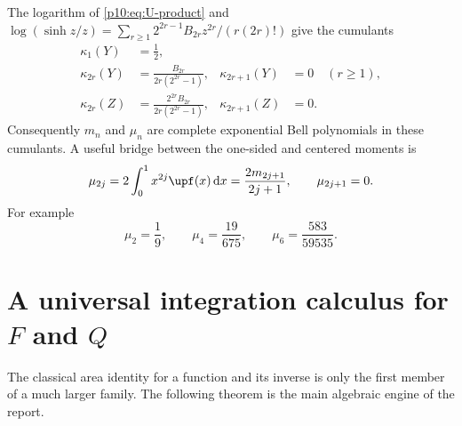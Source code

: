 \documentclass[11pt,oneside]{article}
\theoremstyle{definition}
\theoremstyle{remark}
\newcommand{\F}{F}
\newcommand{\Q}{Q}
\newcommand{\dd}{\,\mathrm d}
\newcommand{\1}{\mathbf 1}
\begin{document}
The logarithm of \cref{p10:eq:U-product} and
\(
 \log(\sinh z/z)
 =\sum_{r\ge1}2^{2r-1}B_{2r}z^{2r}/(r(2r)!)
\)
give the cumulants
\begin{align}
 \kappa_1(Y)&=\frac12,\nonumber\\
 \kappa_{2r}(Y)&=\frac{B_{2r}}{2r(2^{2r}-1)},
 &\kappa_{2r+1}(Y)&=0\quad(r\ge1),\label{p10:eq:Y-cumulants}\\
 \kappa_{2r}(Z)&=\frac{2^{2r}B_{2r}}{2r(2^{2r}-1)},
 &\kappa_{2r+1}(Z)&=0.\label{p10:eq:Z-cumulants}
\end{align}
Consequently \(m_n\) and \(\mu_n\) are complete exponential Bell polynomials in
these cumulants.  A useful bridge between the one-sided and centered moments is
\begin{equation}\label{p10:eq:mu-m-relation}
 \mu_{2j}
 =2\int_0^1x^{2j}\upf(x)\dd x
 =\frac{2m_{2j+1}}{2j+1},
 \qquad \mu_{2j+1}=0.
\end{equation}
For example
\begin{equation}\label{p10:eq:first-central-moments}
 \mu_2=\frac19,\qquad
 \mu_4=\frac{19}{675},\qquad
 \mu_6=\frac{583}{59535}.
\end{equation}

\section{A universal integration calculus for \texorpdfstring{\(\F\)}{F} and
\texorpdfstring{\(\Q\)}{Q}}

The classical area identity for a function and its inverse is only the first member of
a much larger family.  The following theorem is the main algebraic engine of the report.
\end{document}
